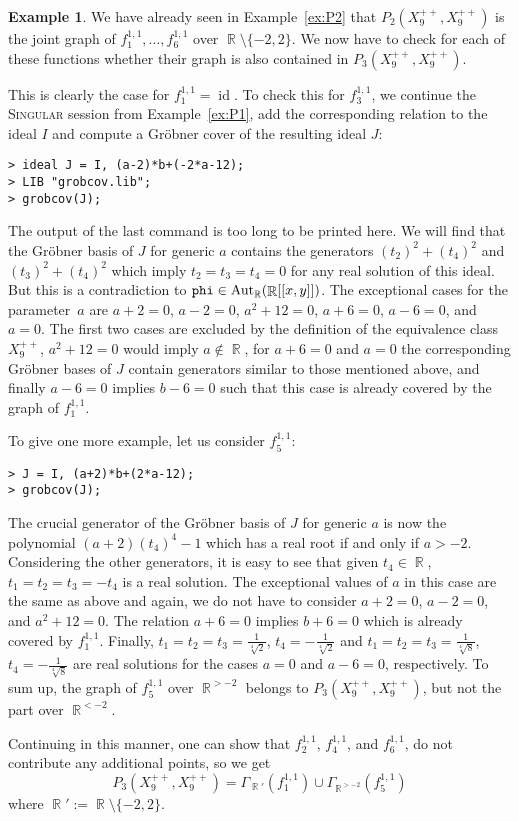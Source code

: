 \documentclass[noend]{amsproc}
\theoremstyle{definition}
\newtheorem{example}[theorem]{Example}
\newcommand{\Singular}{\textsc{Singular}}
\DeclareMathOperator{\R}{\mathbb{R}}
\DeclareMathOperator{\Aut}{Aut}
\DeclareMathOperator{\id}{id}
\begin{document}
\begin{example}
We have already seen in Example~\ref{ex:P2} that
$P_2(X_9^{++}, X_9^{++})$ is the joint graph of
$f_1^{1,1}, \ldots, f_6^{1,1}$ over $\R \setminus \{-2, 2\}$. We now have to
check for each of these functions whether their graph is also contained in
$P_3(X_9^{++}, X_9^{++})$.

This is clearly the case for $f_1^{1,1} = \id$. To check this for $f_3^{1,1}$,
we continue the \Singular{} session from Example~\ref{ex:P1}, add the
corresponding relation to the ideal $I$ and compute a Gr\"obner cover of the
resulting ideal $J$:
\begin{verbatim}
> ideal J = I, (a-2)*b+(-2*a-12);
> LIB "grobcov.lib";
> grobcov(J);
\end{verbatim}
The output of the last command is too long to be printed here. We will find
that the Gr\"obner basis of $J$ for generic $a$ contains the generators
$(t_2)^2+(t_4)^2$ and $(t_3)^2+(t_4)^2$ which imply $t_2 = t_3 = t_4 = 0$ for
any real solution of this ideal. But this is a contradiction to
$\verb+phi+ \in \Aut_{\R}(\R[[x,y]])$. The exceptional cases for the
parameter~$a$ are $a+2=0$, $a-2=0$, $a^2+12=0$, $a+6=0$, $a-6=0$, and $a=0$.
The first two cases are excluded by the definition of the equivalence class
$X_9^{++}$, $a^2+12=0$ would imply $a \not\in \R$, for $a+6=0$ and $a=0$ the
corresponding Gr\"obner bases of $J$ contain generators similar to those
mentioned above, and finally $a-6=0$ implies $b-6=0$ such that this case is
already covered by the graph of $f_1^{1,1}$.

To give one more example, let us consider $f_5^{1,1}$:
\begin{verbatim}
> J = I, (a+2)*b+(2*a-12);
> grobcov(J);
\end{verbatim}
The crucial generator of the Gr\"obner basis of $J$ for generic $a$ is now the
polynomial $(a+2)(t_4)^4-1$ which has a real root if and only if $a > -2$.
Considering the other generators, it is easy to see that given $t_4 \in \R$,
$t_1 = t_2 = t_3 = -t_4$ is a real solution. The exceptional values
of $a$ in this case are the same as above and again, we do not have to consider
$a+2=0$, $a-2=0$, and $a^2+12=0$. The relation $a+6=0$ implies $b+6=0$ which is
already covered by $f_1^{1,1}$. Finally,
$t_1 = t_2 = t_3 = \frac{1}{\sqrt[4]{2}}$, $t_4 = -\frac{1}{\sqrt[4]{2}}$ and
$t_1 = t_2 = t_3 = \frac{1}{\sqrt[4]{8}}$, $t_4 = -\frac{1}{\sqrt[4]{8}}$ are
real solutions for the cases $a=0$ and $a-6=0$, respectively. To sum up,
the graph of $f_5^{1,1}$ over $\R^{>-2}$ belongs to $P_3(X_9^{++}, X_9^{++})$,
but not the part over $\R^{<-2}$.

Continuing in this manner, one can show that $f_2^{1,1}$, $f_4^{1,1}$, and
$f_6^{1,1}$, do not contribute any additional points, so we get
\[
P_3(X_9^{++}, X_9^{++}) = \Gamma_{\R'} \left(f_1^{1,1}\right)
\cup \Gamma_{\R^{>-2}} \left(f_5^{1,1}\right)
\]
where $\R' := \R \setminus \{-2, 2\}$.
\end{example}
\end{document}
